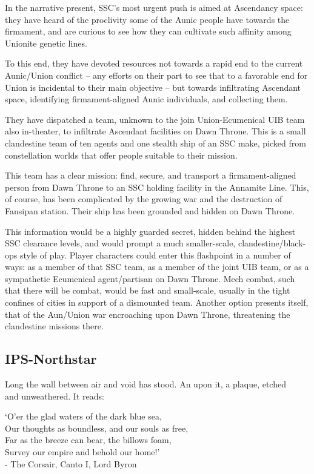 In the narrative present, SSC’s most urgent push is aimed at Ascendancy space: they have heard
of the proclivity some of the Aunic people have towards the firmament, and are curious to see
how they can cultivate such affinity among Unionite genetic lines.

To this end, they have devoted resources not towards a rapid end to the current Aunic/Union
conflict -- any efforts on their part to see that to a favorable end for Union is incidental to their
main objective -- but towards infiltrating Ascendant space, identifying firmament-aligned Aunic
individuals, and collecting them.

They have dispatched a team, unknown to the join Union-Ecumenical UIB team also in-theater,
to infiltrate Ascendant facilities on Dawn Throne. This is a small clandestine team of ten agents
and one stealth ship of an SSC make, picked from constellation worlds that offer people suitable
to their mission.

This team has a clear mission: find, secure, and transport a firmament-aligned person from Dawn
Throne to an SSC holding facility in the Annamite Line. This, of course, has been complicated by
the growing war and the destruction of Fansipan station. Their ship has been grounded and
hidden on Dawn Throne.

This information would be a highly guarded secret, hidden behind the highest SSC clearance
levels, and would prompt a much smaller-scale, clandestine/black-ops style of play. Player
characters could enter this flashpoint in a number of ways: as a member of that SSC team, as a
member of the joint UIB team, or as a sympathetic Ecumenical agent/partisan on Dawn Throne.
Mech combat, such that there will be combat, would be fast and small-scale, usually in the tight
confines of cities in support of a dismounted team.  Another option presents itself, that of the
Aun/Union war encroaching upon Dawn Throne, threatening the clandestine missions there.

\subsection{IPS-Northstar}
\begin{loreQuote}
              Long the wall between air and void has stood. An upon it, a plaque, etched\\
              and unweathered. It reads:\\
\begin{loreQuote}
              ‘O’er the glad waters of the dark blue sea,\\
              Our thoughts as boundless, and our souls as free,\\
              Far as the breeze can bear, the billows foam,\\
              Survey our empire and behold our home!’\\

              \quad - The Corsair, Canto I, Lord Byron
\end{loreQuote}
\end{loreQuote}

